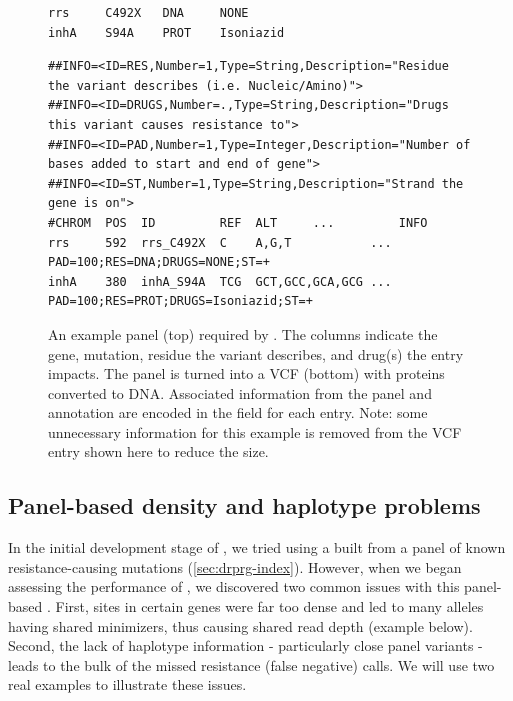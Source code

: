\begin{figure}
\begin{Verbatim}[frame=single,framerule=0.5mm,label=Panel,fontsize=\footnotesize]
rrs     C492X   DNA     NONE
inhA    S94A    PROT    Isoniazid
\end{Verbatim}
\begin{Verbatim}[frame=single,framerule=0.5mm,label=VCF,fontsize=\footnotesize]
##INFO=<ID=RES,Number=1,Type=String,Description="Residue the variant describes (i.e. Nucleic/Amino)">
##INFO=<ID=DRUGS,Number=.,Type=String,Description="Drugs this variant causes resistance to">
##INFO=<ID=PAD,Number=1,Type=Integer,Description="Number of bases added to start and end of gene">
##INFO=<ID=ST,Number=1,Type=String,Description="Strand the gene is on">
#CHROM  POS  ID         REF  ALT     ...         INFO
rrs     592  rrs_C492X  C    A,G,T           ... PAD=100;RES=DNA;DRUGS=NONE;ST=+
inhA    380  inhA_S94A  TCG  GCT,GCC,GCA,GCG ... PAD=100;RES=PROT;DRUGS=Isoniazid;ST=+
\end{Verbatim}
\caption{An example panel (top) required by \drprg{}. The columns indicate the gene, mutation, residue the variant describes, and drug(s) the entry impacts. The panel is turned into a VCF (bottom) with proteins converted to DNA. Associated information from the panel and annotation are encoded in the  field for each entry. Note: some unnecessary information for this example is removed from the VCF entry shown here to reduce the size.}
\label{fig:example-panel}
\end{figure}

\subsection{Panel-based \prg{} density and haplotype problems}
\label{app:panel-prg-issues}

In the initial development stage of \drprg{}, we tried using a \prg{} built from a panel of known resistance-causing mutations (\autoref{sec:drprg-index}). However, when we began assessing the performance of \drprg{}, we discovered two common issues with this panel-based \prg{}. First, sites in certain genes were far too dense and led to many alleles having shared minimizers, thus causing shared read depth (example below). Second, the lack of haplotype information - particularly close panel variants - leads to the bulk of the missed resistance (false negative) calls. We will use two real examples to illustrate these issues.

